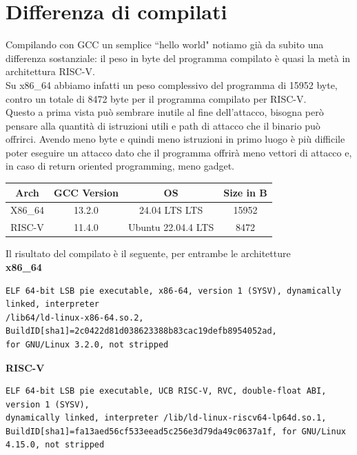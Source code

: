 \section*{Differenza di compilati}
Compilando con GCC un semplice ``hello world" notiamo già da subito una differenza sostanziale: il peso in byte del programma compilato è quasi la metà in architettura RISC-V.\\
Su x86\_64 abbiamo infatti un peso complessivo del programma di 15952 byte, contro un totale di 8472 byte per il programma compilato per RISC-V.\\
Questo a prima vista può sembrare inutile al fine dell'attacco, bisogna però pensare alla quantità di istruzioni utili e path di attacco che il binario può offrirci. Avendo meno byte e quindi meno istruzioni in primo luogo è più difficile poter eseguire un attacco dato che il programma offrirà meno vettori di attacco e, in caso di return oriented programming, meno gadget. 
\begin{center}
\begin{tabular}{| c | c c c|} 
 \hline
 \textbf{Arch} & \textbf{GCC Version} & \textbf{OS} & \textbf{Size in B} \\ [0.5ex] 
 \hline\hline
 X86\_64 & 13.2.0 & 24.04 LTS LTS & 15952 \\ 
 \hline
 RISC-V & 11.4.0 & Ubuntu 22.04.4 LTS & 8472 \\
 \hline
\end{tabular} 
\end{center}
Il risultato del compilato è il seguente, per entrambe le architetture\\
\newline
\textbf{x86\_64}
\begin{verbatim}
ELF 64-bit LSB pie executable, x86-64, version 1 (SYSV), dynamically linked, interpreter
/lib64/ld-linux-x86-64.so.2, BuildID[sha1]=2c0422d81d038623388b83cac19defb8954052ad,
for GNU/Linux 3.2.0, not stripped
\end{verbatim}
\textbf{RISC-V}
\begin{verbatim}
ELF 64-bit LSB pie executable, UCB RISC-V, RVC, double-float ABI, version 1 (SYSV),
dynamically linked, interpreter /lib/ld-linux-riscv64-lp64d.so.1, 
BuildID[sha1]=fa13aed56cf533eead5c256e3d79da49c0637a1f, for GNU/Linux 4.15.0, not stripped
\end{verbatim}

